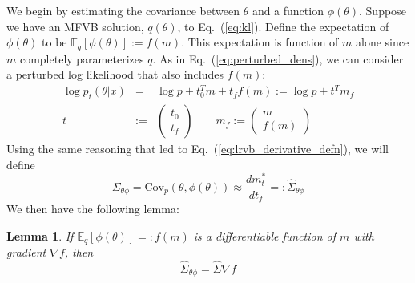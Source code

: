 \documentclass{article}\usepackage[]{graphicx}\usepackage[]{color}
\newcommand{\eq}[1]{Eq.~(\ref{eq:#1})}
\newcommand{\truecov}{\Sigma} %
\newcommand{\lrcov}{\hat{\Sigma}} %
\newtheorem{lemma}[theorem]{Lemma}
\newcommand{\mbeq}{\mathbb{E}_{q}}
\newcommand{\cov}{\textrm{Cov}}
\begin{document}
We begin by estimating the covariance between $\theta$ and a function
$\phi(\theta)$. Suppose we have an MFVB solution, $q(\theta)$, to \eq{kl}.
Define the expectation of $\phi(\theta)$ to be $\mbeq\left[\phi(\theta)\right] :=
f(m)$.  This expectation is function of $m$ alone since $m$ completely
parameterizes $q$. As in \eq{perturbed_dens}, we can consider a perturbed log
likelihood that also includes $f\left(m\right)$:
%
\begin{eqnarray*}
  \log p_{t}\left(\theta\vert x \right) & = &
    \log p+t_{0}^{T}m+t_{f}f\left(m\right):=\log p+t^{T}m_{f}\\
  t & := & \left(\begin{array}{c}
  t_{0}\\
  t_{f}
  \end{array}\right) \quad \quad
  m_{f} := \left(\begin{array}{c}
  m\\
  f\left(m\right)
  \end{array}\right)
\end{eqnarray*}
%
Using the same reasoning that led to \eq{lrvb_derivative_defn}, we will define
%
$$
\truecov_{\theta \phi} = \cov_p(\theta, \phi(\theta))
  \approx \frac{dm_t^{*}}{dt_f} =: \lrcov_{\theta\phi}
$$
%
We then have the following lemma:
%
\begin{lemma} \label{lem:theta_function_covariance}
  If $\mbeq\left[\phi(\theta)\right] =: f(m)$ is a differentiable function of $m$
  with gradient $\nabla f$, then
  $$
  \lrcov_{\theta\phi} = \lrcov \nabla f
  $$
\end{lemma}
\end{document}
